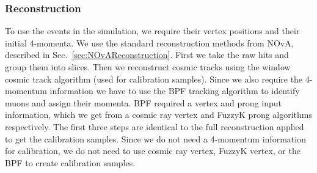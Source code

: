 \subsubsection*{Reconstruction}
To use the events in the simulation, we require their vertex positions and their initial 4-momenta. We use the standard reconstruction methods from \gls{NOvA}, described in Sec.~\ref{sec:NOvAReconstruction}. First we take the raw hits and group them into slices. Then we reconstruct cosmic tracks using the window cosmic track algorithm (used for calibration samples). Since we also require the 4-momentum information we have to use the \gls{BPF} tracking algorithm to identify muons and assign their momenta. \gls{BPF} required a vertex and prong input information, which we get from a cosmic ray vertex and FuzzyK prong algorithms respectively. The first three steps are identical to the full reconstruction applied to get the calibration samples. Since we do not need a 4-momentum information for calibration, we do not need to use cosmic ray vertex, FuzzyK vertex, or the \gls{BPF} to create calibration samples.

